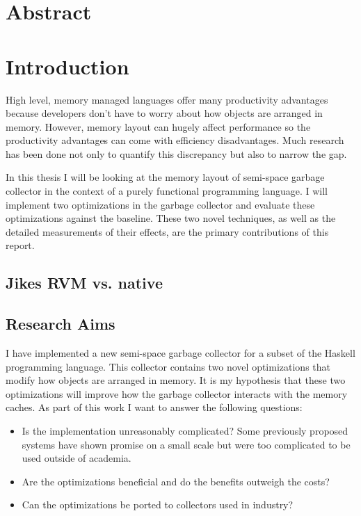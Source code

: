 \documentclass[a4paper,oneside]{memoir}
\begin{document}


\chapter*{Abstract}



\newpage

\tableofcontents*

\chapter{Introduction}
High level, memory managed languages offer many productivity advantages because
developers don't have to worry about how objects are arranged in memory. However,
memory layout can hugely affect performance so the productivity advantages can
come with efficiency disadvantages. Much research has been done not only to
quantify this discrepancy but also to narrow the gap.

In this thesis I will be looking at the memory layout of semi-space garbage
collector in the context of a purely functional programming language.
I will implement two optimizations in the garbage collector and evaluate these
optimizations against the baseline. These two novel techniques, as well as the
detailed measurements of their effects, are the primary contributions of this
report.

\section{Jikes RVM vs. native}

\section{Research Aims}
I have implemented a new semi-space garbage collector for a subset of the
Haskell programming language. This collector contains two novel optimizations
that modify how objects are arranged in memory. It is my hypothesis that these
two optimizations will improve how the garbage collector interacts with the
memory caches. As part of this work I want to answer the following questions:
\begin{itemize}
  \item Is the implementation unreasonably complicated? Some previously proposed
    systems have shown promise on a small scale but were too complicated to be
    used outside of academia.
  \item Are the optimizations beneficial and do the benefits outweigh the costs?
  \item Can the optimizations be ported to collectors used in industry?
\end{itemize}
\end{document}
